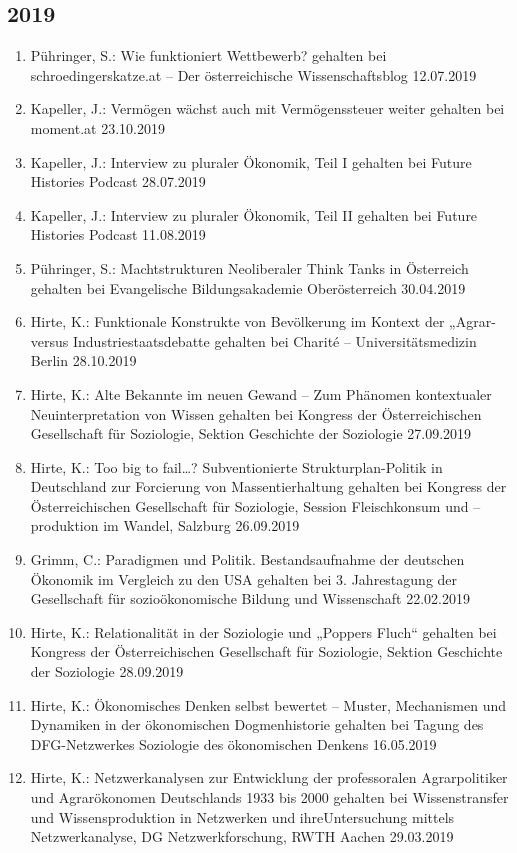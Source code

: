 \subsection*{2019}
\begin{enumerate}
	\item Pühringer, S.: Wie funktioniert Wettbewerb? gehalten bei schroedingerskatze.at -- Der österreichische Wissenschaftsblog 12.07.2019
	\item Kapeller, J.: Vermögen wächst auch mit Vermögenssteuer weiter gehalten bei moment.at 23.10.2019
	\item Kapeller, J.: Interview zu pluraler Ökonomik, Teil I gehalten bei Future Histories Podcast 28.07.2019
	\item Kapeller, J.: Interview zu pluraler Ökonomik, Teil II gehalten bei Future Histories Podcast 11.08.2019
	\item Pühringer, S.: Machtstrukturen Neoliberaler Think Tanks in Österreich gehalten bei Evangelische Bildungsakademie Oberösterreich 30.04.2019
	\item Hirte, K.: Funktionale Konstrukte von Bevölkerung im Kontext der „Agrar- versus Industriestaatsdebatte gehalten bei Charité -- Universitätsmedizin Berlin 28.10.2019
	\item Hirte, K.: \glqq Alte Bekannte im neuen Gewand\grqq{} – Zum Phänomen kontextualer Neuinterpretation von Wissen gehalten bei Kongress der Österreichischen Gesellschaft für Soziologie, Sektion Geschichte der Soziologie 27.09.2019
	\item Hirte, K.: Too big to fail…? Subventionierte Strukturplan-Politik in Deutschland zur Forcierung von Massentierhaltung gehalten bei Kongress der Österreichischen Gesellschaft für Soziologie, Session Fleischkonsum und –produktion im Wandel, Salzburg 26.09.2019
	\item Grimm, C.: Paradigmen und Politik. Bestandsaufnahme der deutschen Ökonomik im Vergleich zu den USA gehalten bei 3. Jahrestagung der Gesellschaft für sozioökonomische Bildung und Wissenschaft 22.02.2019
	\item Hirte, K.: Relationalität in der Soziologie und „Poppers Fluch“ gehalten bei Kongress der Österreichischen Gesellschaft für Soziologie, Sektion Geschichte der Soziologie 28.09.2019
	\item Hirte, K.: Ökonomisches Denken selbst bewertet – Muster, Mechanismen und Dynamiken in der ökonomischen Dogmenhistorie gehalten bei Tagung des DFG-Netzwerkes \glqq Soziologie des ökonomischen Denkens\grqq{} 16.05.2019
	\item Hirte, K.: Netzwerkanalysen zur Entwicklung der professoralen Agrarpolitiker und Agrarökonomen Deutschlands 1933 bis 2000 gehalten bei Wissenstransfer und Wissensproduktion in Netzwerken und ihreUntersuchung mittels Netzwerkanalyse, DG Netzwerkforschung, RWTH Aachen 29.03.2019

\end{enumerate}
